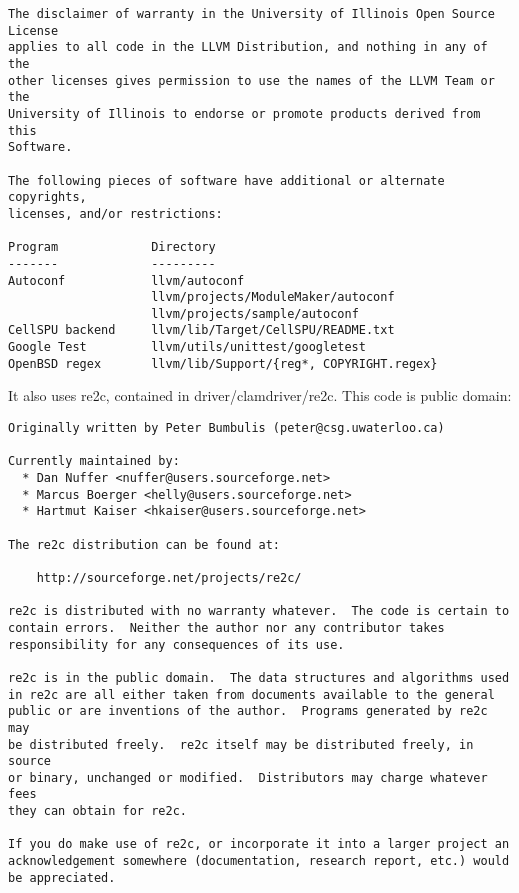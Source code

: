 {\begin{verbatim}
The disclaimer of warranty in the University of Illinois Open Source License
applies to all code in the LLVM Distribution, and nothing in any of the
other licenses gives permission to use the names of the LLVM Team or the
University of Illinois to endorse or promote products derived from this
Software.

The following pieces of software have additional or alternate copyrights,
licenses, and/or restrictions:

Program             Directory
-------             ---------
Autoconf            llvm/autoconf
                    llvm/projects/ModuleMaker/autoconf
                    llvm/projects/sample/autoconf
CellSPU backend     llvm/lib/Target/CellSPU/README.txt
Google Test         llvm/utils/unittest/googletest
OpenBSD regex       llvm/lib/Support/{reg*, COPYRIGHT.regex}
\end{verbatim}
}

It also uses re2c, contained in driver/clamdriver/re2c.
This code is public domain:
{\footnotesize
\begin{verbatim}
Originally written by Peter Bumbulis (peter@csg.uwaterloo.ca)

Currently maintained by:
  * Dan Nuffer <nuffer@users.sourceforge.net>
  * Marcus Boerger <helly@users.sourceforge.net>
  * Hartmut Kaiser <hkaiser@users.sourceforge.net>

The re2c distribution can be found at:

    http://sourceforge.net/projects/re2c/

re2c is distributed with no warranty whatever.  The code is certain to
contain errors.  Neither the author nor any contributor takes
responsibility for any consequences of its use.

re2c is in the public domain.  The data structures and algorithms used
in re2c are all either taken from documents available to the general
public or are inventions of the author.  Programs generated by re2c may
be distributed freely.  re2c itself may be distributed freely, in source
or binary, unchanged or modified.  Distributors may charge whatever fees
they can obtain for re2c.

If you do make use of re2c, or incorporate it into a larger project an
acknowledgement somewhere (documentation, research report, etc.) would
be appreciated.
\end{verbatim}
}

